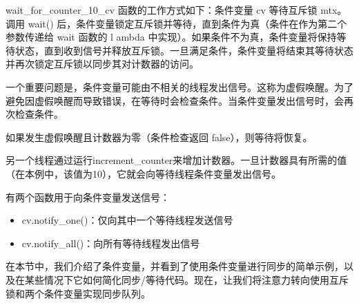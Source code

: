 wait\_for\_counter\_10\_cv 函数的工作方式如下：条件变量 cv 等待互斥锁 mtx。调用 wait() 后，条件变量锁定互斥锁并等待，直到条件为真（条件在作为第二个参数传递给 wait 函数的 l ambda 中实现）。如果条件不为真，条件变量将保持等待状态，直到收到信号并释放互斥锁。一旦满足条件，条件变量将结束其等待状态并再次锁定互斥锁以同步其对计数器的访问。

一个重要问题是，条件变量可能由不相关的线程发出信号。这称为虚假唤醒。为了避免因虚假唤醒而导致错误，在等待时会检查条件。当条件变量发出信号时，会再次检查条件。

如果发生虚假唤醒且计数器为零（条件检查返回 false），则等待将恢复。

另一个线程通过运行increment\_counter来增加计数器。一旦计数器具有所需的值（在本例中，该值为10），它就会向等待线程条件变量发出信号。

有两个函数用于向条件变量发送信号：

\begin{itemize}
\item
cv.notify\_one()：仅向其中一个等待线程发送信号

\item
cv.notify\_all()：向所有等待线程发出信号
\end{itemize}

在本节中，我们介绍了条件变量，并看到了使用条件变量进行同步的简单示例，以及在某些情况下它如何简化同步/等待代码。现在，让我们将注意力转向使用互斥锁和两个条件变量实现同步队列。
























